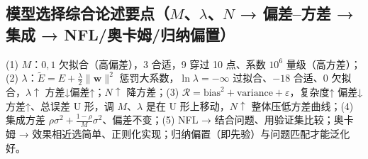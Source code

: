 \subsection{模型选择综合论述要点（\texorpdfstring{$M$、$\lambda$、$N$}{M, lambda, N} → 偏差–方差 → 集成 → NFL/奥卡姆/归纳偏置）}
(1) $M$：$0,1$ 欠拟合（高偏差），3 合适，9 穿过 10 点、系数 $10^6$ 量级（高方差）；(2) $\lambda$：$\tilde E=E+\frac\lambda2\|\bm w\|^2$ 惩罚大系数，$\ln\lambda=-\infty$ 过拟合、$-18$ 合适、$0$ 欠拟合，$\lambda\uparrow$ 方差↓偏差↑；$N\uparrow$ 降方差；(3) $\mathcal R=\text{bias}^2+\text{variance}+\varepsilon$，复杂度↑ 偏差↓方差↑、总误差 U 形，调 $M$、$\lambda$ 是在 U 形上移动，$N\uparrow$ 整体压低方差曲线；(4) 集成方差 $\rho\sigma^2+\frac{1-\rho}{M}\sigma^2$、偏差不变；(5) NFL → 结合问题、用验证集比较；奥卡姆 → 效果相近选简单、正则化实现；归纳偏置（即先验）与问题匹配才能泛化好。

